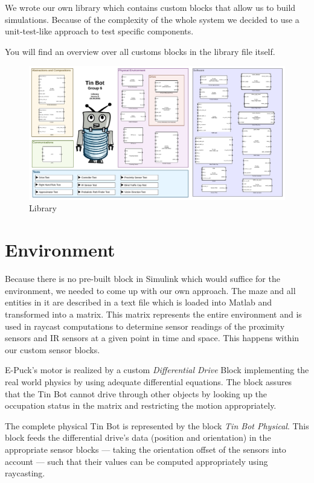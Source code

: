 \documentclass[a4paper,parskip,headheight=38pt]{scrartcl} %
\begin{document}
We wrote our own library which contains custom blocks that allow us to build simulations. Because of the complexity of the whole system we decided to use a unit-test-like approach to test specific components.

You will find an overview over all customs blocks in the library file itself.

\begin{figure}[htp]
\centering
\includegraphics[width=\textwidth]{library.pdf}
\caption{Library}
\label{}
\end{figure}

\section{Environment}
Because there is no pre-built block in Simulink which would suffice for the environment, we needed to come up with our own approach. The maze and all entities in it are described in a text file which is loaded into Matlab and transformed into a matrix. This matrix represents the entire environment and is used in raycast computations to determine sensor readings of the proximity sensors and IR sensors at a given point in time and space. This happens within our custom sensor blocks.

E-Puck's motor is realized by a custom \emph{Differential Drive} Block implementing the real world physics by using adequate differential equations. The block assures that the Tin Bot cannot drive through other objects by looking up the occupation status in the matrix and restricting the motion appropriately.

The complete physical Tin Bot is represented by the block \emph{Tin Bot Physical}. This block feeds the differential drive's data (position and orientation) in the appropriate sensor blocks — taking the orientation offset of the sensors into account — such that their values can be computed appropriately using raycasting.
\end{document}

